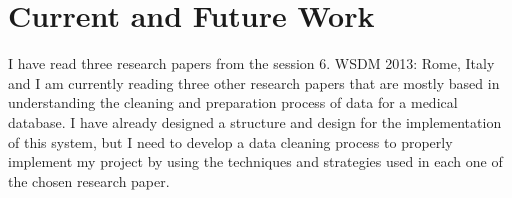\documentclass{sig-alternate}
\begin{document}
\section{Current and Future Work}
\label{Current and Future Work}
I have read three research papers from the session 6. WSDM 2013: Rome, Italy and I am currently reading three other research papers that are mostly based in understanding the cleaning and preparation process of data for a medical database. I have already designed a structure and design for the implementation of this system, but I need to develop a data cleaning process to properly implement my project by using the techniques and strategies used in each one of the chosen research paper.




\end{document}
